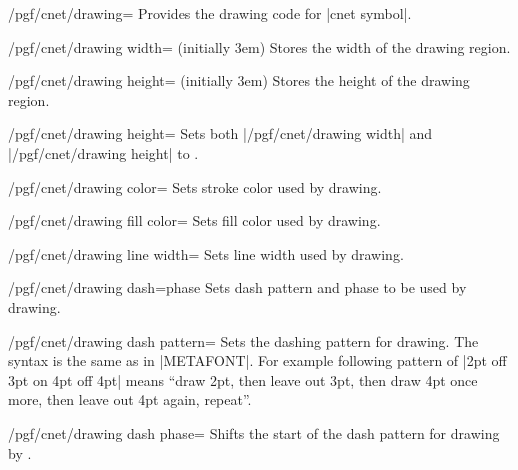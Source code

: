 \documentclass[a4paper]{ltxdoc}
\begin{document}
\begin{key}{/pgf/cnet/drawing=}
  Provides the drawing code for |cnet symbol|.
\end{key}

\begin{key}{/pgf/cnet/drawing width= (initially 3em)}
  Stores the width of the drawing region.
\end{key}

\begin{key}{/pgf/cnet/drawing height= (initially 3em)}
  Stores the height of the drawing region.
\end{key}

\begin{key}{/pgf/cnet/drawing height=}
  Sets both |/pgf/cnet/drawing width| and |/pgf/cnet/drawing height| to
  .
\end{key}

\begin{key}{/pgf/cnet/drawing color=}
  Sets stroke color used by drawing.
\end{key}

\begin{key}{/pgf/cnet/drawing fill color=}
  Sets fill color used by drawing.
\end{key}

\begin{key}{/pgf/cnet/drawing line width=}
  Sets line width used by drawing.
\end{key}

\begin{key}{/pgf/cnet/drawing dash=phase}
  Sets dash pattern and phase to be used by drawing.
\end{key}

\begin{key}{/pgf/cnet/drawing dash pattern=}
  Sets the dashing pattern for drawing. The syntax is the same as in
  |METAFONT|. For example following pattern of |2pt off 3pt on 4pt off 4pt|
  means ``draw 2pt, then leave out 3pt, then draw 4pt once more, then leave out
  4pt again, repeat''.
\end{key}

\begin{key}{/pgf/cnet/drawing dash phase=}
  Shifts the start of the dash pattern for drawing by .
\end{key}
\end{document}
